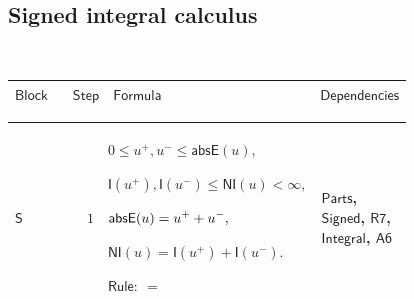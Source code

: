 \documentclass[12pt,reqno]{amsart}
\theoremstyle{blueplain}
\numberwithin{equation}{section}
\newlength{\DCTOneColumnBody}
\begin{document}
{\scriptsize \ }

\subsection{\protect\scriptsize Signed integral calculus}

{\scriptsize {\ }}

{\scriptsize \setlength{\parskip}{0pt}\nointerlineskip
\noindent 
\begin{tabular}{|@{}>{\centering\arraybackslash}m{\DCTOneColumnBody}|}
\hline
$\displaystyle \mathsf{SignedIntegralCalculus}$ \\ \hline
\end{tabular}%
}

{\scriptsize \setlength{\parskip}{0pt}\nointerlineskip
\noindent 
\begin{tabular}{|@{}>{\centering\arraybackslash}m{0.10658\linewidth}|>{\centering\arraybackslash}m{0.03553\linewidth}|>{\centering\arraybackslash}m{0.52105\linewidth}|>{\centering\arraybackslash}m{0.23684\linewidth}|}
\hline
$\displaystyle \mathsf{Block}$ & $\displaystyle \mathsf{Step}$ & $%
\displaystyle \mathsf{Formula}$ & $\displaystyle \mathsf{Dependencies}$ \\ 
\hline
\end{tabular}%
}

{\scriptsize \setlength{\parskip}{0pt}\nointerlineskip
\noindent 
\begin{tabular}{|@{}>{\centering\arraybackslash}m{\DCTOneColumnBody}|}
\hline
$\displaystyle \mathsf{Context\_S}:=$\par$\displaystyle u,v:\mathsf{RF},\quad%
\mathsf{L1}(u)\land\mathsf{L1}(v).$ \\ \hline
\end{tabular}%
}

{\scriptsize \setlength{\parskip}{0pt}\nointerlineskip
\noindent 
\begin{tabular}{|@{}>{\centering\arraybackslash}m{0.10658\linewidth}|>{\centering\arraybackslash}m{0.03553\linewidth}|>{\centering\arraybackslash}m{0.52105\linewidth}|>{\centering\arraybackslash}m{0.23684\linewidth}|}
\hline
\hypertarget{dct:S1}{$\displaystyle \mathsf{S}$} & $\displaystyle 1$ & $%
\displaystyle 0\le u^+,u^-\le\mathsf{absE}(u),$\par$\displaystyle \mathsf{I}%
(u^+),\mathsf{I}(u^-)\le\mathsf{NI}(u)<\infty,$\par$\displaystyle \mathsf{%
absE}(u)=u^++u^-,$\par$\displaystyle \mathsf{NI}(u)=\mathsf{I}(u^+)+\mathsf{I%
}(u^-).$\par$\displaystyle \mathsf{Rule}:\ =$ & \hyperlink{dctdef:Parts}{$%
\displaystyle \mathsf{Parts}$}, \hyperlink{dctdef:Signed}{$\displaystyle 
\mathsf{Signed}$}, \hyperlink{dct:R7}{$\displaystyle \mathsf{R7}$}, 
\hyperlink{lem:Integral}{$\displaystyle \mathsf{Integral}$}, \hyperlink{dct:A6}%
{$\displaystyle \mathsf{A6}$} \\ \hline
\end{tabular}%
}
\end{document}
